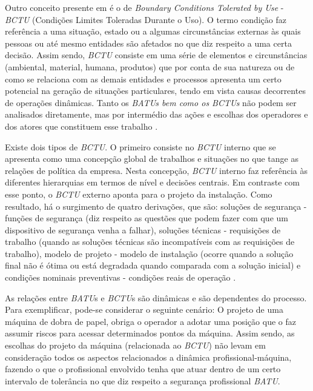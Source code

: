 Outro conceito presente em \cite{safety} é o de \textit{Boundary Conditions Tolerated by Use} - \textit{BCTU} (Condições Limites Toleradas Durante o Uso). O termo condição faz referência a uma situação, estado ou a algumas circunstâncias externas às quais pessoas ou até mesmo entidades são afetados no que diz respeito a uma certa decisão. Assim sendo, \textit{BCTU} consiste em uma série de elementos e circunstâncias (ambiental, material, humana, produtos) que por conta de sua natureza ou de como se relaciona com as demais entidades e processos apresenta um certo potencial na geração de situações particulares, tendo em vista causas decorrentes de operações dinâmicas. Tanto os \textit{BATUs bem como os BCTUs} não podem ser analisados diretamente, mas por intermédio das ações e escolhas dos operadores e dos atores que constituem esse trabalho \cite{safety}. 

Existe dois tipos de \textit{BCTU}. O primeiro consiste no \textit{BCTU} interno que se apresenta como uma concepção global de trabalhos e situações no que tange as relações de política da empresa. Nesta concepção, \textit{BCTU} interno faz referência às diferentes hierarquias em termos de nível e decisões centrais. Em contraste com esse ponto, o \textit{BCTU} externo aponta para o projeto da instalação. Como resultado, há o surgimento de quatro derivações, que são: soluções de segurança - funções de segurança (diz respeito as questões que podem fazer com que um dispositivo de segurança venha a falhar), soluções técnicas - requisições de trabalho (quando as soluções técnicas são incompatíveis com as requisições de trabalho), modelo de projeto - modelo de instalação (ocorre quando a solução final não é ótima ou está degradada quando comparada com a solução inicial) e condições nominais preventivas - condições reais de operação
\cite{safety}.

As relações entre \textit{BATU}s e \textit{BCTU}s são dinâmicas e são dependentes do processo. Para exemplificar, pode-se considerar o seguinte cenário: O projeto de uma máquina de dobra de papel, obriga o operador a adotar uma posição que o faz assumir riscos para acessar determinados pontos da máquina.  Assim sendo, as escolhas do projeto da máquina (relacionada ao \textit{BCTU}) não levam em consideração todos os aspectos relacionados a dinâmica profissional-máquina, fazendo o que o profissional envolvido tenha que atuar dentro de um certo intervalo de tolerância no que diz respeito a segurança profissional \textit{BATU}.
